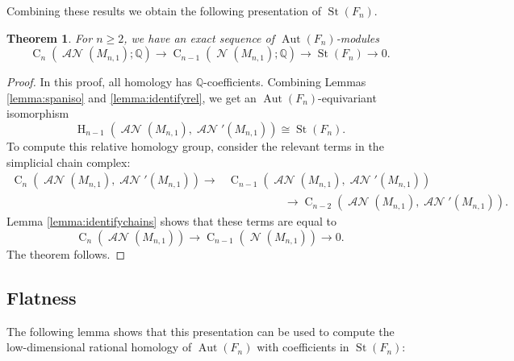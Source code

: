 \documentclass[11pt]{amsart}
\numberwithin{equation}{section}
\theoremstyle{plain}
\newtheorem{theorem}{Theorem}[section]
\theoremstyle{definition}
\theoremstyle{remark}
\newcommand\Q{\ensuremath{\mathbb{Q}}}
\DeclareMathOperator{\HH}{H}
\DeclareMathOperator{\CC}{C}
\DeclareMathOperator{\Aut}{Aut}
\DeclareMathOperator{\St}{St}
\DeclareMathOperator{\NSpheres}{\mathcal{N}}
\DeclareMathOperator{\ANSpheres}{\mathcal{AN}}
\begin{document}
Combining these results we obtain the following presentation of $\St(F_n)$.

\begin{theorem} 
\label{theorem:stpresentation}
For $n \geq 2$, we have an exact sequence of $\Aut(F_n)$-modules
\[\CC_n(\ANSpheres(M_{n,1});\Q) \to \CC_{n-1}(\NSpheres(M_{n,1});\Q) \to \St(F_n) \to 0.\]
\end{theorem}
\begin{proof}
In this proof, all homology has $\Q$-coefficients.  Combining Lemmas \ref{lemma:spaniso} and \ref{lemma:identifyrel}, we get an 
$\Aut(F_n)$-equivariant isomorphism
\[\HH_{n-1}(\ANSpheres(M_{n,1}),\ANSpheres'(M_{n,1})) \cong \St(F_n).\]
To compute this relative homology group, consider the relevant terms in the simplicial chain complex:
\begin{align*}
\CC_n(\ANSpheres(M_{n,1}),\ANSpheres'(M_{n,1})) \longrightarrow &\CC_{n-1}(\ANSpheres(M_{n,1}),\ANSpheres'(M_{n,1})) \\
&\quad\quad\quad \quad \quad \longrightarrow \CC_{n-2}(\ANSpheres(M_{n,1}),\ANSpheres'(M_{n,1})).
\end{align*}
Lemma \ref{lemma:identifychains} shows that these terms are equal to
\[\CC_n(\ANSpheres(M_{n,1})) \rightarrow \CC_{n-1}(\NSpheres(M_{n,1})) \rightarrow 0.\]
The theorem follows.
\end{proof}

\subsection{Flatness}

The following lemma shows that this presentation can be used to compute the low-dimensional rational homology
of $\Aut(F_n)$ with coefficients in $\St(F_n)$:
\end{document}
